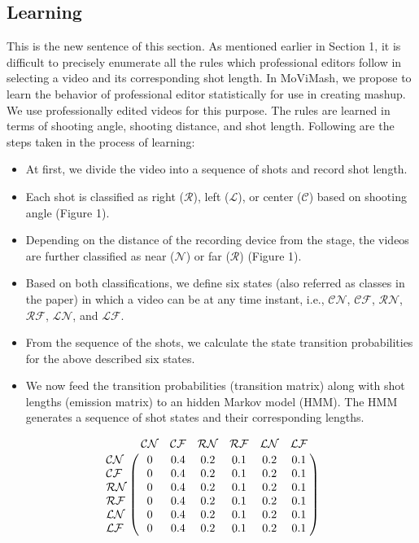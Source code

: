 \documentclass{sig-alternate}
\begin{document}
{{{\subsection{Learning}
This is the new sentence of this section.
As mentioned earlier in Section 1, it is difficult to precisely enumerate
all the rules which professional editors follow in selecting
a video and its corresponding shot length. In MoViMash, we propose
to learn the behavior of professional editor statistically for use
in creating mashup. We use professionally edited videos for this
purpose. The rules are learned in terms of shooting angle, shooting
distance, and shot length. Following are the steps taken in the
process of learning:
\begin{itemize}
    \item At first, we divide the video into a sequence of shots and
record shot length.
\item Each shot is classified as right ($\mathcal{R}$), left ($\mathcal{L}$), or center ($\mathcal{C}$)
based on shooting angle (Figure 1).
\item Depending on the distance of the recording device from the
stage, the videos are further classified as near ($\mathcal{N}$) or far ($\mathcal{R}$)
(Figure 1).
   \item Based on both classifications, we define six states (also referred
as classes in the paper) in which a video can be at any
time instant, i.e., $\mathcal{CN}$, $\mathcal{CF}$, $\mathcal{RN}$, $\mathcal{RF}$, $\mathcal{LN}$, and $\mathcal{LF}$.
  \item  From the sequence of the shots, we calculate the state transition
probabilities for the above described six states.
  \item  We now feed the transition probabilities (transition matrix)
along with shot lengths (emission matrix) to an hidden Markov
model (HMM). The HMM generates a sequence of shot states
and their corresponding lengths.
\end{itemize}
$$
\bordermatrix{~ &\mathcal{CN} & \mathcal{CF}& \mathcal{RN}& \mathcal{RF}& \mathcal{LN}&\mathcal{LF} \cr
  \mathcal{CN} &0& 0.4& 0.2 &0.1& 0.2& 0.1 \cr
  \mathcal{CF}  &0& 0.4& 0.2 &0.1& 0.2& 0.1 \cr
  \mathcal{RN}  &0& 0.4& 0.2 &0.1& 0.2& 0.1 \cr
  \mathcal{RF}  &0& 0.4& 0.2 &0.1& 0.2& 0.1 \cr
  \mathcal{LN}  &0& 0.4& 0.2 &0.1& 0.2& 0.1 \cr
  \mathcal{LF}  &0& 0.4& 0.2 &0.1& 0.2& 0.1 \cr
  }
$$

}}}
\end{document}
